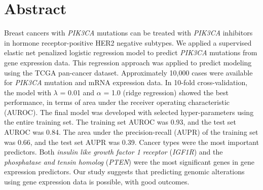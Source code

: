 \documentclass[10pt,letterpaper]{article}
\newcommand{\getIndex}[2]{
  \ForEach{,}{\IfEq{#1}{\thislevelitem}{\number\thislevelcount\ExitForEach}{}}{#2}
}
\newcommand{\getAff}[1]{
  \getIndex{#1}{Department of Hospital Pathology, Seoul St.~Mary's Hospital}
}
\begin{document}
\vspace*{0.2in}

\section*{Abstract}
Breast cancers with \emph{PIK3CA} mutations can be treated with
\emph{PIK3CA} inhibitors in hormone receptor-positive HER2 negative
subtypes. We applied a supervised elastic net penalized logistic
regression model to predict \emph{PIK3CA} mutations from gene expression
data. This regression approach was applied to predict modeling using the
TCGA pan-cancer dataset. Approximately 10,000 cases were available for
\emph{PIK3CA} mutation and mRNA expression data. In 10-fold
cross-validation, the model with \(\lambda\) = 0.01 and \(\alpha\) = 1.0
(ridge regression) showed the best performance, in terms of area under
the receiver operating characteristic (AUROC). The final model was
developed with selected hyper-parameters using the entire training set.
The training set AUROC was 0.93, and the test set AUROC was 0.84. The
area under the precision-recall (AUPR) of the training set was 0.66, and
the test set AUPR was 0.39. Cancer types were the most important
predictors. Both \emph{insulin like growth factor 1 receptor}
(\emph{IGF1R}) and the \emph{phosphatase and tensin homolog}
(\emph{PTEN}) were the most significant genes in gene expression
predictors. Our study suggests that predicting genomic alterations using
gene expression data is possible, with good outcomes.
\end{document}
